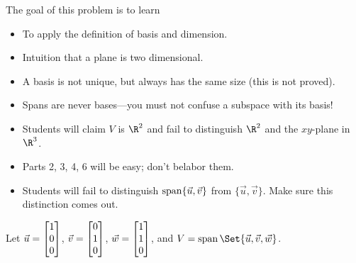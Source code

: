 \documentclass{problemset}
\begin{document}
	\question
	\begin{annotation}
		\begin{goals}

			The goal of this problem is to learn
			\begin{itemize}
				\item To apply the definition of basis and dimension.
				\item Intuition that a plane is two dimensional.
				\item A basis is not unique, but always has the same size (this is not proved).
				\item Spans are never bases---you must not confuse a subspace with its basis!
			\end{itemize}
		\end{goals}

		\begin{notes}
			\begin{itemize}
				\item Students will claim $V$ is $\R^2$ and fail to distinguish
					$\R^2$ and the $xy$-plane in $\R^3$.
				\item Parts 2, 3, 4, 6 will be easy; don't belabor them.
				\item Students will fail to distinguish $\operatorname{span}\{\vec u,\vec v\}$
					from $\{\vec u,\vec v\}$. Make sure this distinction comes out.
			\end{itemize}
		\end{notes}
	\end{annotation}
	Let $\vec u=\mat{1\\0\\0}$, $\vec v=\mat{0\\1\\0}$, $\vec w=\mat{1\\1\\0}$,
	and $V=\Span\Set{\vec u,\vec v,\vec w}$.
\end{document}
